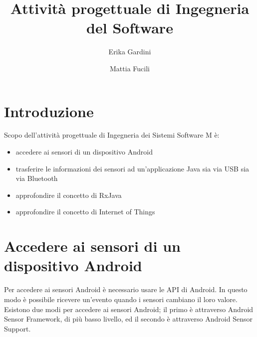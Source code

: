 \documentclass{article}
\begin{document}
\title{Attività progettuale di Ingegneria del Software} \author{Erika Gardini \and Mattia Fucili}
\maketitle
\newpage
\section{Introduzione}
Scopo dell'attività progettuale di Ingegneria dei Sistemi Software M è:
\begin{itemize}
    \item accedere ai sensori di un dispositivo Android
    \item trasferire le informazioni dei sensori ad un'applicazione Java sia via USB sia via Bluetooth
    \item approfondire il concetto di RxJava
    \item approfondire il concetto di Internet of Things 
\end{itemize}
\newpage
\section{Accedere ai sensori di un dispositivo Android}
Per accedere ai sensori Android è necessario usare le API di Android. In questo modo è possibile ricevere un'evento quando i sensori cambiano il loro valore. 
Esistono due modi per accedere ai sensori Android; il primo è attraverso Android Sensor Framework, di più basso livello, ed il secondo è attraverso Android Sensor Support.
\end{document}
